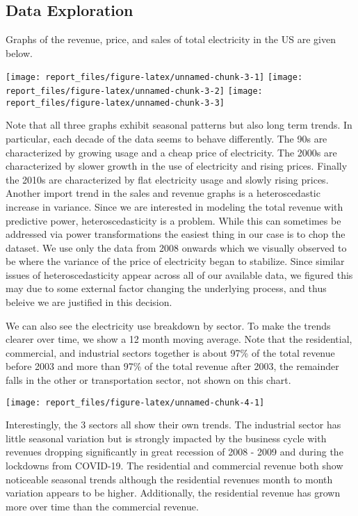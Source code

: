 \documentclass[
]{article}
\begin{document}
\subsection{Data Exploration}

Graphs of the revenue, price, and sales of total electricity in the US
are given below.

\begin{center}\texttt{[image: report\_files/figure-latex/unnamed-chunk-3-1]} \texttt{[image: report\_files/figure-latex/unnamed-chunk-3-2]} \texttt{[image: report\_files/figure-latex/unnamed-chunk-3-3]} \end{center}

Note that all three graphs exhibit seasonal patterns but also long term
trends. In particular, each decade of the data seems to behave
differently. The 90s are characterized by growing usage and a cheap
price of electricity. The 2000s are characterized by slower growth in
the use of electricity and rising prices. Finally the 2010s are
characterized by flat electricity usage and slowly rising prices.
Another import trend in the sales and revenue graphs is a
heteroscedastic increase in variance. Since we are interested in
modeling the total revenue with predictive power, heteroscedasticity is
a problem. While this can sometimes be addressed via power
transformations the easiest thing in our case is to chop the dataset. We
use only the data from 2008 onwards which we visually observed to be
where the variance of the price of electricity began to stabilize. Since
similar issues of heteroscedasticity appear across all of our available
data, we figured this may due to some external factor changing the
underlying process, and thus beleive we are justified in this decision.

We can also see the electricity use breakdown by sector. To make the
trends clearer over time, we show a 12 month moving average. Note that
the residential, commercial, and industrial sectors together is about
97\% of the total revenue before 2003 and more than 97\% of the total
revenue after 2003, the remainder falls in the other or transportation
sector, not shown on this chart.

\begin{center}\texttt{[image: report\_files/figure-latex/unnamed-chunk-4-1]} \end{center}

Interestingly, the 3 sectors all show their own trends. The industrial
sector has little seasonal variation but is strongly impacted by the
business cycle with revenues dropping significantly in great recession
of 2008 - 2009 and during the lockdowns from COVID-19. The residential
and commercial revenue both show noticeable seasonal trends although the
residential revenues month to month variation appears to be higher.
Additionally, the residential revenue has grown more over time than the
commercial revenue.
\end{document}

